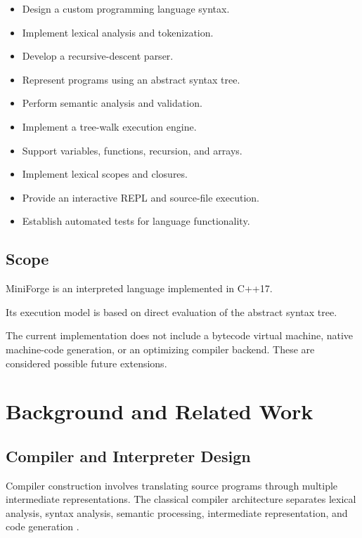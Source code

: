 \documentclass[conference]{IEEEtran}
\begin{document}
\begin{itemize}
    \item Design a custom programming language syntax.
    \item Implement lexical analysis and tokenization.
    \item Develop a recursive-descent parser.
    \item Represent programs using an abstract syntax tree.
    \item Perform semantic analysis and validation.
    \item Implement a tree-walk execution engine.
    \item Support variables, functions, recursion, and arrays.
    \item Implement lexical scopes and closures.
    \item Provide an interactive REPL and source-file execution.
    \item Establish automated tests for language functionality.
\end{itemize}

\subsection{Scope}

MiniForge is an interpreted language implemented in C++17.

Its execution model is based on direct evaluation of
the abstract syntax tree.

The current implementation does not include a bytecode
virtual machine, native machine-code generation, or an
optimizing compiler backend. These are considered
possible future extensions.

\section{Background and Related Work}

\subsection{Compiler and Interpreter Design}

Compiler construction involves translating source
programs through multiple intermediate representations.
The classical compiler architecture separates lexical
analysis, syntax analysis, semantic processing,
intermediate representation, and code generation
\cite{aho,dragon,cooper}.
\end{document}
